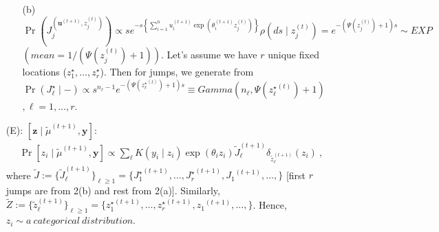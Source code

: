 \documentclass[10pt, oneside]{article}   	%
\renewcommand{\th}{\theta}
\newcommand{\ub}{\mathbf{u}}
\begin{document}
\begin{itemize}
\begin{itemize}
 \item[(b)] $\Pr\left(J^{\left({\ub}^{(t+1)}, z^{(t)}_j\right)}_j\right) \propto s e^{-s \left\{\sum_{i=1}^n u^{(t+1)}_i \exp(\th^{(t+1)}_i z^{(t)}_j)\right\}} \rho(ds \mid z^{(t)}_j) =  e^{- \left(\Psi\left(z^{(t)}_j\right) +1\right) s} \sim EXP$ $\left(mean = 1\bigg/\left(\Psi\left(z^{(t)}_j\right) +1\right)\right)$. Let's assume we have $r$ unique fixed locations ($z^\star_1, \dots, z^\star_r$). Then for jumps, we generate from $\Pr(J^\star_\ell \mid -)\propto s^{n_\ell - 1}  e^{- \left(\Psi\left({z^\star_\ell}^{(t)}\right) +1\right) s} \equiv Gamma\left(n_\ell,  \Psi\left({z^\star_\ell}^{(t)}\right) +1\right)$ $, \ell = 1, \dots, r$.
\end{itemize}
\item[(E):] $[\mathbf{z} \mid {\widetilde \mu}^{(t+1)}, \mathbf{y}]:$ 
\begin{eqnarray*}
\Pr[z_i \mid {\widetilde \mu}^{(t+1)}, \mathbf{y}] \propto \sum_{\ell} K(y_i \mid z_i) \exp(\theta_i z_i) {\widetilde{J}}^{(t+1)}_\ell \delta_{{\widetilde z}^{(t+1)}_\ell}(z_i)\ ,
\end{eqnarray*} 
where $\widetilde J := \{{\widetilde{J}}^{(t+1)}_\ell \}_{\ell \geq 1} = \{{J^\star_1}^{(t+1)}, \dots,  {J^\star_r}^{(t+1)}, {J_1}^{(t+1)}, \dots, \}$ [first $r$ jumps are from 2(b) and rest from 2(a)]. Similarly, $\widetilde Z := \{{\widetilde z}^{(t+1)}_\ell\}_{\ell \geq 1} = \{{z^\star_1}^{(t+1)}, \dots,  {z^\star_r}^{(t+1)}, {z_1}^{(t+1)}, \dots, \}$. Hence, $z_i \sim a \ categorical \ distribution$. 
\end{itemize}
\end{document}
